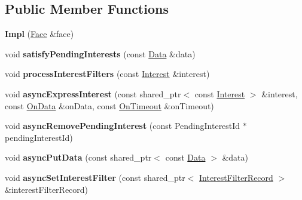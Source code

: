 \subsection*{Public Member Functions}
\begin{DoxyCompactItemize}
\item 
{\bfseries Impl} (\hyperlink{classndn_1_1Face}{Face} \&face)\hypertarget{classndn_1_1Face_1_1Impl_a22c6bbd0f2d805678a4a44c860bf75d6}{}\label{classndn_1_1Face_1_1Impl_a22c6bbd0f2d805678a4a44c860bf75d6}

\item 
void {\bfseries satisfy\+Pending\+Interests} (const \hyperlink{classndn_1_1Data}{Data} \&data)\hypertarget{classndn_1_1Face_1_1Impl_ac216917074307edce464121dec975ad9}{}\label{classndn_1_1Face_1_1Impl_ac216917074307edce464121dec975ad9}

\item 
void {\bfseries process\+Interest\+Filters} (const \hyperlink{classndn_1_1Interest}{Interest} \&interest)\hypertarget{classndn_1_1Face_1_1Impl_a4fed7e04fbe1d11a8dbb59ebfd5caf38}{}\label{classndn_1_1Face_1_1Impl_a4fed7e04fbe1d11a8dbb59ebfd5caf38}

\item 
void {\bfseries async\+Express\+Interest} (const shared\+\_\+ptr$<$ const \hyperlink{classndn_1_1Interest}{Interest} $>$ \&interest, const \hyperlink{namespacendn_a3594ce6ee9b530d1fd0eb0d59d3587da}{On\+Data} \&on\+Data, const \hyperlink{namespacendn_aa4752a1808de5e7246dd6b1151e4e87f}{On\+Timeout} \&on\+Timeout)\hypertarget{classndn_1_1Face_1_1Impl_a3272c79953819e95fe9ecdc0568af278}{}\label{classndn_1_1Face_1_1Impl_a3272c79953819e95fe9ecdc0568af278}

\item 
void {\bfseries async\+Remove\+Pending\+Interest} (const Pending\+Interest\+Id $\ast$pending\+Interest\+Id)\hypertarget{classndn_1_1Face_1_1Impl_a564da675f1a0558318b20de862cbf4d2}{}\label{classndn_1_1Face_1_1Impl_a564da675f1a0558318b20de862cbf4d2}

\item 
void {\bfseries async\+Put\+Data} (const shared\+\_\+ptr$<$ const \hyperlink{classndn_1_1Data}{Data} $>$ \&data)\hypertarget{classndn_1_1Face_1_1Impl_a867f954f2ac4747d1cabc193d2c93637}{}\label{classndn_1_1Face_1_1Impl_a867f954f2ac4747d1cabc193d2c93637}

\item 
void {\bfseries async\+Set\+Interest\+Filter} (const shared\+\_\+ptr$<$ \hyperlink{classndn_1_1InterestFilterRecord}{Interest\+Filter\+Record} $>$ \&interest\+Filter\+Record)\hypertarget{classndn_1_1Face_1_1Impl_adecba627018279f6bfa47459cec1069b}{}\label{classndn_1_1Face_1_1Impl_adecba627018279f6bfa47459cec1069b}


\end{DoxyCompactItemize}
